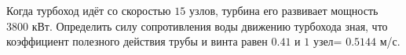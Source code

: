 Когда турбоход идёт со скоростью $15$ узлов, турбина его развивает
мощность $3800$ кВт. Определить силу сопротивления воды движению
турбохода зная, что коэффициент полезного действия трубы и винта равен
$0.41$ и $1$ узел= $0.5144$ м/с.
